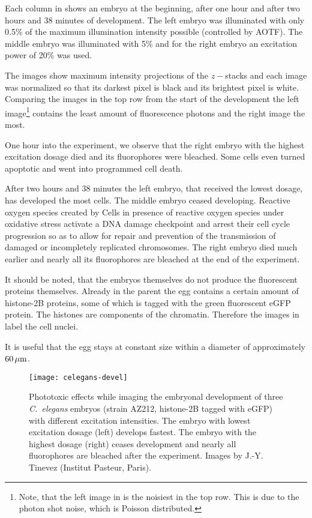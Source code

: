 Each column in  shows an embryo at the
beginning, after one hour and after two hours and 38 minutes of
development. The left embryo was illuminated with only 0.5\% of the
maximum illumination intensity possible (controlled by AOTF). The
middle embryo was illuminated with 5\% and for the right embryo an
excitation power of 20\% was used.

The images show maximum intensity projections of the $z-$stacks and
each image was normalized so that its darkest pixel is black and its
brightest pixel is white. Comparing the images in the top row from the
start of the development the left image\footnote{Note, that the left
  image in  is the noisiest in the top
  row. This is due to the photon shot noise, which is Poisson
  distributed.} contains the least amount of fluorescence photons and
the right image the most.

One hour into the experiment, we observe that the right embryo with
the highest excitation dosage died and its fluorophores were bleached.
Some cells even turned apoptotic and went into programmed cell death.

After two hours and 38 minutes the left embryo, that received the
lowest dosage, has developed the most cells. The middle embryo ceased
developing. Reactive oxygen species created by Cells in presence of
reactive oxygen species under oxidative stress activate a DNA damage
checkpoint and arrest their cell cycle progression so as to allow for
repair and prevention of the transmission of damaged or incompletely
replicated chromosomes. The right embryo died much earlier and nearly
all its fluorophores are bleached at the end of the experiment.



It should be noted, that the embryos themselves do not produce the
fluorescent proteins themselves. Already in the parent the egg
contains a certain amount of histone-2B proteins, some of which is
tagged with the green fluorescent eGFP protein. The histones are
components of the chromatin. Therefore the images in
 label the cell nuclei.

It is useful that the egg stays at constant size within a diameter
of approximately $\unit[60]{\mu m}$.

\begin{figure}[!htb]
  \centering
  \texttt{[image: celegans-devel]}
  \caption{Phototoxic effects while imaging the embryonal development
    of three \emph{C.~elegans} embryos (strain AZ212, histone-2B
    tagged with eGFP) with different excitation intensities. The
    embryo with lowest excitation dosage (left) develops fastest. The
    embryo with the highest dosage (right) ceases development and
    nearly all fluorophores are bleached after the experiment. Images by
    J.-Y. Tinevez (Institut Pasteur, Paris).}
  \label{fig:celegans-devel}
\end{figure}


